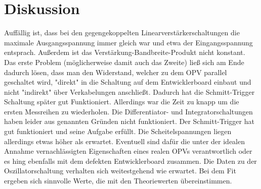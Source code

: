\documentclass[
  bibliography=totoc,     %
  captions=tableheading,  %
  titlepage=firstiscover, %
]{scrartcl}
\begin{document}
\section{Diskussion}
\label{diskussion}
Auffällig ist, dass bei den gegengekoppelten Linearverstärkerschaltungen die
maximale Ausgangsspannung immer gleich war und etwa der Eingangsspannung entsprach.
Außerdem ist das Verstärkung-Bandbreite-Produkt nicht konstant. Das erste
Problem (möglicherweise damit auch das Zweite) ließ sich am Ende dadurch lösen,
dass man den Widerstand, welcher zu dem OPV parallel geschaltet wird, "direkt"
in die Schaltung auf dem Entwicklerboard einbaut und nicht "indirekt"
über Verkabelungen anschließt. Dadurch hat die Schmitt-Trigger Schaltung später
gut Funktioniert. Allerdings war die Zeit zu knapp um die ersten Messreihen zu
wiederholen. Die Differentiator- und Integratorschaltungen haben leider aus genannten
Gründen nicht funktioniert. Der Schmitt-Trigger hat gut funktioniert und seine
Aufgabe erfüllt. Die Scheitelspannungen liegen allerdings etwas höher als erwartet.
Eventuell sind dafür die unter der idealen Annahme vernachlässigten Eigenschaften
eines realen OPVs verantwortlich oder es hing ebenfalls mit dem defekten Entwicklerboard
zusammen. Die Daten zu der Oszillatorschaltung verhalten sich weitestgehend wie
erwartet. Bei dem Fit ergeben sich sinnvolle Werte, die mit den Theoriewerten übereinstimmen.
\newpage
\nocite{*}
\printbibliography
\end{document}
